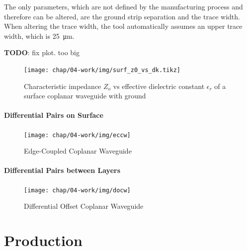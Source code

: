 The only parameters, which are not defined by the manufacturing process and therefore can be altered, are the ground strip separation and the trace width. %
When altering the trace width, the tool automatically assumes an upper trace width, which is \SI{25}{\micro \meter}.

\textbf{TODO}: fix plot. too big

\begin{figure}
	\centering
	\texttt{[image: chap/04-work/img/surf\_z0\_vs\_dk.tikz]}  
	\caption{Characteristic impedance $Z_o$ vs effective dielectric constant $\epsilon_r$ of a surface coplanar waveguide with ground}
	\label{fig:surf_z0_vs_dk}
\end{figure}



 \paragraph{Differential Pairs on Surface}
\begin{figure}[!htbp]
	\centering
	\texttt{[image: chap/04-work/img/eccw]}
	\caption{Edge-Coupled Coplanar Waveguide}
	\label{fig:eccw_geometry}
\end{figure}

\paragraph{Differential Pairs between Layers}
\begin{figure}[!htbp]
	\centering
	\texttt{[image: chap/04-work/img/docw]}
	\caption{Differential Offset Coplanar Waveguide}
	\label{fig:docw}
\end{figure}






\section{Production}
